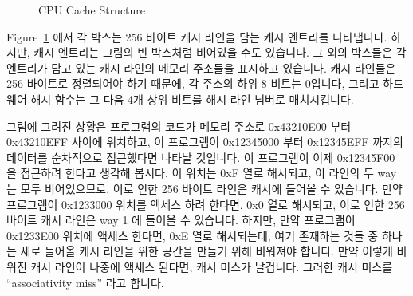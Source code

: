 \begin{figure}[t]
\begin{picture}
\end{picture}
\caption{CPU Cache Structure}
\label{fig:app:whymb:CPU Cache Structure}
\end{figure}

Figure~\ref{fig:app:whymb:CPU Cache Structure} 에서 각 박스는 256 바이트 캐시
라인을 담는 캐시 엔트리를 나타냅니다.
하지만, 캐시 엔트리는 그림의 빈 박스처럼 비어있을 수도 있습니다.
그 외의 박스들은 각 엔트리가 담고 있는 캐시 라인의 메모리 주소들을 표시하고
있습니다.
캐시 라인들은 256 바이트로 정렬되어야 하기 때문에, 각 주소의 하위 8 비트는
0입니다, 그리고 하드웨어 해시 함수는 그 다음 4개 상위 비트를 해시 라인 넘버로
매치시킵니다.
\iffalse

In Figure~\ref{fig:app:whymb:CPU Cache Structure},
each box corresponds to a cache entry, which
can contain a 256-byte cache line.
However, a cache entry can be empty, as indicated by the empty boxes
in the figure.
The rest of the boxes are flagged with the memory address of the cache line
that they contain.
Since the cache lines must be 256-byte aligned, the low eight bits of
each address are
zero, and the choice of hardware hash function means that the next-higher
four bits match the hash line number.
\fi

그림에 그려진 상황은 프로그램의 코드가 메모리 주소로 0x43210E00 부터 0x43210EFF
사이에 위치하고, 이 프로그램이 0x12345000 부터 0x12345EFF 까지의 데이터를
순차적으로 접근했다면 나타날 것입니다.
이 프로그램이 이제 0x12345F00 을 접근하려 한다고 생각해 봅시다.
이 위치는 0xF 열로 해시되고, 이 라인의 두 way 는 모두 비어있으므로, 이로 인한
256 바이트 라인은 캐시에 들어올 수 있습니다.
만약 프로그램이 0x1233000 위치를 액세스 하려 한다면, 0x0 열로 해시되고, 이로
인한 256 바이트 캐시 라인은 way 1 에 들어올 수 있습니다.
하지만, 만약 프로그램이 0x1233E00 위치에 액세스 한다면, 0xE 열로 해시되는데,
여기 존재하는 것들 중 하나는 새로 들어올 캐시 라인을 위한 공간을 만들기 위해
비워져야 합니다.
만약 이렇게 비워진 캐시 라인이 나중에 액세스 된다면, 캐시 미스가 날겁니다.
그러한 캐시 미스를 ``associativity miss'' 라고 합니다.
\iffalse

The situation depicted in the figure might arise if the program's code
were located at address 0x43210E00 through 0x43210EFF, and this program
accessed data sequentially from 0x12345000 through 0x12345EFF.
Suppose that the program were now to access location 0x12345F00.
This location hashes to line 0xF, and both ways of this line are
empty, so the corresponding 256-byte line can be accommodated.
If the program were to access location 0x1233000, which hashes to line
0x0, the corresponding 256-byte cache line can be accommodated in
way 1.
However, if the program were to access location 0x1233E00, which hashes
to line 0xE, one of the existing lines must be ejected from the cache
to make room for the new cache line.
If this ejected line were accessed later, a cache miss would result.
Such a cache miss is termed an ``associativity miss''.
\fi

